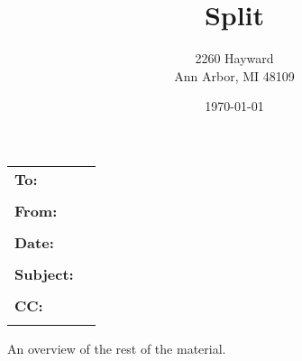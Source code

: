 \documentclass[11pt]{article}
\title{Split}
\author{2260 Hayward \\
Ann Arbor, MI 48109}
\date{\today}
\newcommand{\makeheader}{
\begin{tabular}{ll}
\textbf{To:} & \varto \\ \\
\textbf{From:} & \varfrom \\ \\
\textbf{Date:} & \vardate \\ \\
\textbf{Subject:} & \varsubject \\ \\
\textbf{CC:} & \varcc \\ \\
\end{tabular}
}
\begin{document}
\maketitle
\makeheader

\overview An overview of the rest of the material.
\end{document}
